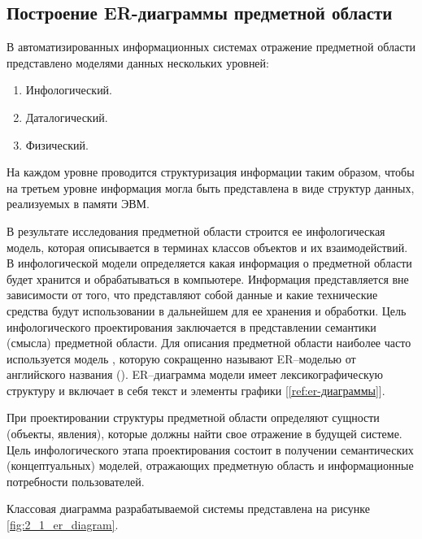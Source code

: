 \documentclass[../nirs.tex]{subfiles}
\begin{document}
\subsection{Построение ER-диаграммы предметной области}
В автоматизированных информационных системах отражение предметной области
представлено моделями данных нескольких уровней:
\begin{enumerate}
  \item Инфологический.
  \item Даталогический.
  \item Физический.
\end{enumerate}

На каждом уровне проводится структуризация информации таким образом, чтобы на
третьем уровне информация могла быть представлена в виде структур данных,
реализуемых в памяти ЭВМ.

В результате исследования предметной области строится ее инфологическая модель,
которая описывается в терминах классов объектов и их взаимодействий. В
инфологической модели определяется какая информация о предметной области будет
хранится и обрабатываться в компьютере. Информация представляется вне
зависимости от того, что представляют собой данные и какие технические средства
будут использовании в дальнейшем для ее хранения и обработки. Цель инфологического
проектирования заключается в представлении семантики (смысла) предметной
области. Для описания предметной области наиболее часто используется модель
, которую сокращенно называют ER–моделью от
английского названия  (). ER–диаграмма модели имеет лексикографическую структуру и включает в
себя текст и элементы графики [\ref{ref:er-диаграммы}].

При проектировании структуры предметной области определяют сущности (объекты,
явления), которые должны найти свое отражение в будущей системе.
Цель инфологического этапа проектирования состоит в получении семантических
(концептуальных) моделей, отражающих предметную область и информационные
потребности пользователей.

Классовая диаграмма разрабатываемой системы представлена на рисунке
\ref{fig:2_1_er_diagram}.
\end{document}
